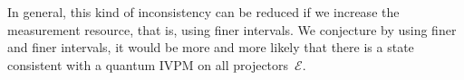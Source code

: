 \documentclass[english,reprint, aps, prl,superscriptaddress, showpacs,
showkeys, longbibliography, amsmath, amssymb]{revtex4-1}
\theoremstyle{plain}
\theoremstyle{definition}
\newcommand{\events}{\ensuremath{\mathcal{E}}}
\newcommand{\imposs}{{\text{\wesa{impossible}}}}
\newcommand{\necess}{{\text{\wesa{certain}}}}
\begin{document}
In general, this kind of inconsistency can be reduced if we increase
the measurement resource, that is, using finer intervals. We conjecture
by using finer and finer intervals, it would be more and more likely
that there is a state consistent with a quantum IVPM on all projectors~$\events$.


\end{document}
